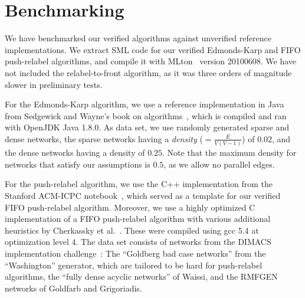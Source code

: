 \documentclass[smallcondensed]{svjour3}     %
\newcommand{\isai}{\lstinline[language=isabelle,basicstyle=\normalsize\ttfamily\slshape]}
\begin{document}
\begin{comment}
We use the previous results to complete the proof of the first step. It is easy
to see that \isai{init-preflow} and \isa{init-labeling} produce a valid preflow
as well as a valid height labeling function. We have also shown the maintanance
of these properties earlier. When the algorithm terminates, the excess value
$e(v)$ of each node $v \in V$ is equal to $0$. So, the preflow that was
maintained during the execution becomes a valid flow. Given the fact that the
height labeling assumptions are also maintained and using the latest auxillary
lemma, we can conclude that there is no path from source to sink in the residual
graph. Hence, the result of the algorithm is a maximum flow using the
Ford-fulkerson theorem.

\texttt{\\\\---Discuss termination proofs if required}

\texttt{\\\\---Discuss our time complexity proof, if required}

\texttt{\\\\---talk about relabel-to-front and fifo instances}

\end{comment}
  
\section{Benchmarking}\label{sec:benchmark}
  We have benchmarked our verified algorithms against unverified reference implementations.
  We extract SML code for our verified Edmonds-Karp and FIFO push-relabel algorithms, and compile it with MLton~\cite{MLton} version 20100608.
  We have not included the relabel-to-front algorithm, as it was three orders of magnitude slower in preliminary tests.
  
  For the Edmonds-Karp algorithm, we use a reference implementation in Java from Sedgewick and Wayne's book on algorithms~\cite{SeWa11}, which 
  is compiled and ran with OpenJDK Java 1.8.0.
  As data set, we use randomly generated sparse and dense networks, the sparse networks having a \emph{density} (${} = \frac{E}{V(V - 1)}$) of $0.02$, and the dense networks having a density of $0.25$. Note that the maximum density for networks that satisfy our assumptions is $0.5$, as we allow no parallel edges.
  
  For the push-relabel algorithm, we use the C++ implementation from the Stanford ACM-ICPC notebook~\cite{ICPC-notebook}, which served as 
  a template for our verified FIFO push-relabel algorithm. Moreover, we use a highly optimized C implementation of a FIFO push-relabel 
  algorithm with various additional heuristics by Cherkassky et al.~\cite{ChGo97}. These were compiled using gcc 5.4 at optimization level 4.
  The data set consists of networks from the DIMACS implementation challenge~\cite{JGC93}: 
  The ``Goldberg bad case networks'' from the ``Washington'' generator, which are tailored to be hard for push-relabel algorithms, 
  the ``fully dense acyclic networks'' of Waissi, and the RMFGEN networks of Goldfarb and Grigoriadis. 
  
\end{document}
